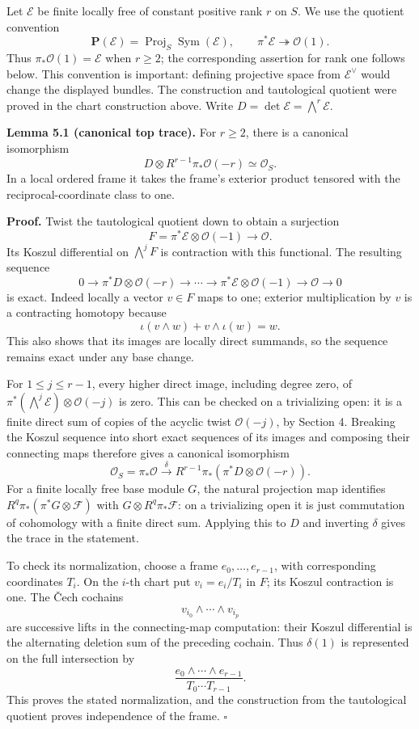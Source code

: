 \documentclass[11pt]{article}
\begin{document}
Let \(\mathcal E\) be finite locally free of constant positive rank
\(r\) on \(S\). We use the quotient convention \[
\mathbf P(\mathcal E)=\operatorname{Proj}_S\operatorname{Sym}(\mathcal E),
\qquad\pi^*\mathcal E\twoheadrightarrow\mathcal O(1).
\] Thus \(\pi_*\mathcal O(1)=\mathcal E\) when \(r\ge2\); the
corresponding assertion for rank one follows below. This convention is
important: defining projective space from \(\mathcal E^\vee\) would
change the displayed bundles. The construction and tautological quotient
were proved in the chart construction above. Write
\(D=\det\mathcal E=\bigwedge^r\mathcal E\).

\textbf{Lemma 5.1 (canonical top trace).} For \(r\ge2\), there is a
canonical isomorphism \[
D\otimes R^{r-1}\pi_*\mathcal O(-r)\simeq\mathcal O_S.
\] In a local ordered frame it takes the frame's exterior product
tensored with the reciprocal-coordinate class to one.

\textbf{Proof.} Twist the tautological quotient down to obtain a
surjection \[
F=\pi^*\mathcal E\otimes\mathcal O(-1)\longrightarrow\mathcal O.
\] Its Koszul differential on \(\bigwedge^j F\) is contraction with this
functional. The resulting sequence \[
0\to\pi^*D\otimes\mathcal O(-r)\to\cdots\to
\pi^*\mathcal E\otimes\mathcal O(-1)\to\mathcal O\to0
\] is exact. Indeed locally a vector \(v\in F\) maps to one; exterior
multiplication by \(v\) is a contracting homotopy because \[
\iota(v\wedge w)+v\wedge\iota(w)=w.
\] This also shows that its images are locally direct summands, so the
sequence remains exact under any base change.

For \(1\le j\le r-1\), every higher direct image, including degree zero,
of \(\pi^*(\bigwedge^j\mathcal E)\otimes\mathcal O(-j)\) is zero. This
can be checked on a trivializing open: it is a finite direct sum of
copies of the acyclic twist \(\mathcal O(-j)\), by Section 4. Breaking
the Koszul sequence into short exact sequences of its images and
composing their connecting maps therefore gives a canonical isomorphism
\[
\mathcal O_S=\pi_*\mathcal O
\xrightarrow{\delta}R^{r-1}\pi_*(\pi^*D\otimes\mathcal O(-r)).
\] For a finite locally free base module \(G\), the natural projection
map identifies \(R^q\pi_*(\pi^*G\otimes\mathcal F)\) with
\(G\otimes R^q\pi_*\mathcal F\): on a trivializing open it is just
commutation of cohomology with a finite direct sum. Applying this to
\(D\) and inverting \(\delta\) gives the trace in the statement.

To check its normalization, choose a frame \(e_0,\ldots,e_{r-1}\), with
corresponding coordinates \(T_i\). On the \(i\)-th chart put
\(v_i=e_i/T_i\) in \(F\); its Koszul contraction is one. The Čech
cochains \[
v_{i_0}\wedge\cdots\wedge v_{i_p}
\] are successive lifts in the connecting-map computation: their Koszul
differential is the alternating deletion sum of the preceding cochain.
Thus \(\delta(1)\) is represented on the full intersection by \[
\frac{e_0\wedge\cdots\wedge e_{r-1}}{T_0\cdots T_{r-1}}.
\] This proves the stated normalization, and the construction from the
tautological quotient proves independence of the frame. \(\square\)
\end{document}

